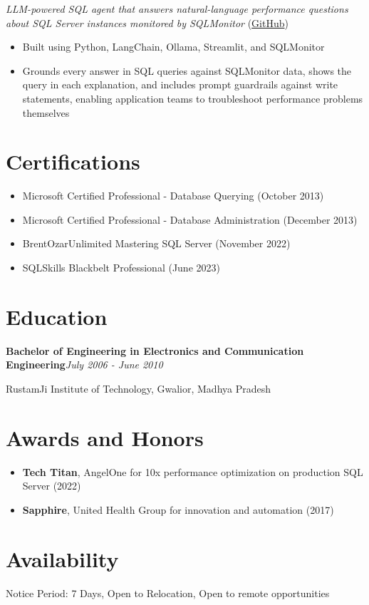 \documentclass[10pt,a4paper]{article}
\begin{document}
\textit{LLM-powered SQL agent that answers natural-language performance questions about SQL Server instances monitored by SQLMonitor} (\href{https://github.com/imajaydwivedi/SQLMonitor/tree/dev/AI-Agent}{GitHub})
\begin{itemize}
  \item Built using Python, LangChain, Ollama, Streamlit, and SQLMonitor
  \item Grounds every answer in SQL queries against SQLMonitor data, shows the query in each explanation, and includes prompt guardrails against write statements, enabling application teams to troubleshoot performance problems themselves
\end{itemize}

\section{Certifications}
\begin{itemize}
  \item Microsoft Certified Professional - Database Querying (October 2013)
  \item Microsoft Certified Professional - Database Administration (December 2013)
  \item BrentOzarUnlimited Mastering SQL Server (November 2022)
  \item SQLSkills Blackbelt Professional (June 2023)
\end{itemize}

\section{Education}
\noindent\textbf{Bachelor of Engineering in Electronics and Communication Engineering}\hfill \textit{July 2006 - June 2010}

RustamJi Institute of Technology, Gwalior, Madhya Pradesh

\section{Awards and Honors}
\begin{itemize}
  \item \textbf{Tech Titan}, AngelOne for 10x performance optimization on production SQL Server (2022)
  \item \textbf{Sapphire}, United Health Group for innovation and automation (2017)
\end{itemize}

\section{Availability}
Notice Period: 7 Days, Open to Relocation, Open to remote opportunities
\end{document}
